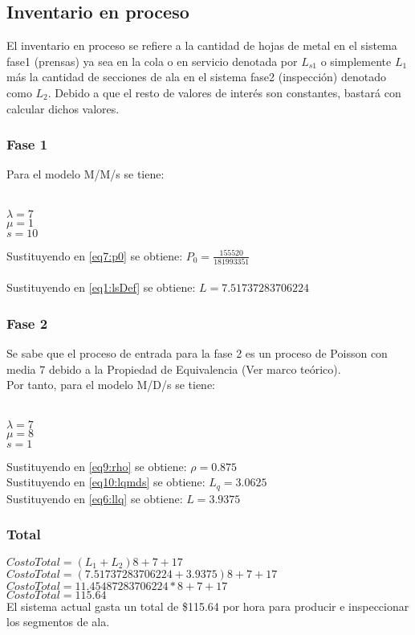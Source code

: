 \documentclass{article}
\begin{document}
\subsection{Inventario en proceso}
El inventario en proceso se refiere a la cantidad de hojas de metal en el sistema 
fase1 (prensas) ya sea en la cola o en servicio denotada por $L_{s1}$ o simplemente $L_{1}$
más la cantidad de secciones de ala en el sistema fase2 (inspección) denotado como
$L_{2}$. Debido a que el resto de valores de interés son constantes, bastará 
con calcular dichos valores.
\subsubsection{Fase 1}
Para el modelo M/M/s se tiene: \\\\
\begin{large}
$\lambda = 7$\\
$\mu = 1$\\
$ s = 10$\\
\end{large}
Sustituyendo en \ref{eq7:p0} se obtiene: $P_{0}=\frac{155520}{181993351}$\\\\
Sustituyendo en \ref{eq1:lsDef} se obtiene: $L = 7.51737283706224$

\subsubsection{Fase 2}
Se sabe que el proceso de entrada para la fase 2 es un proceso de Poisson con media 7 
debido a la Propiedad de Equivalencia (Ver marco teórico).\\
Por tanto, para el modelo M/D/s se tiene: \\\\
\begin{Large}
$\lambda = 7$\\
$\mu = 8$\\
$s = 1$\\
\end{Large}
Sustituyendo en \ref{eq9:rho} se obtiene: $\rho = 0.875$ \\
Sustituyendo en \ref{eq10:lqmds} se obtiene: $L_{q} = 3.0625$\\
Sustituyendo en \ref{eq6:llq} se obtiene: $L = 3.9375$
\subsubsection{Total}
\noindent $CostoTotal = \left( L_{1} + L_{2} \right) 8 + 7 + 17$ \\
$CostoTotal = \left( 7.51737283706224 + 3.9375 \right) 8 + 7 + 17$ \\
$CostoTotal = 11.45487283706224*8 + 7 + 17$\\
$CostoTotal = 115.64 $\\
El sistema actual gasta un total de \$115.64 por hora para producir e inspeccionar
los segmentos de ala.
\end{document}
